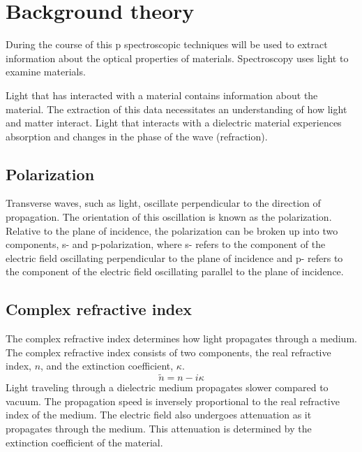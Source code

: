 \chapter{Background theory}
\label{chp:Theory}

During the course of this p spectroscopic techniques will be used to extract information about the optical properties of materials. Spectroscopy uses light to examine materials.

Light that has interacted with a material contains information about the material. The extraction of this data necessitates an understanding of how light and matter interact. Light that interacts with a dielectric material experiences absorption and changes in the phase of the wave (refraction).

\section{Polarization}
\label{sec:Pol}

Transverse waves, such as light, oscillate perpendicular to the direction of propagation. The orientation of this oscillation is known as the polarization. Relative to the plane of incidence, the polarization can be broken up into two components, s- and p-polarization, where s- refers to the component of the electric field oscillating perpendicular to the plane of incidence and p- refers to the component of the electric field oscillating parallel to the plane of incidence.

\section{Complex refractive index}
\label{sec:Attenuation}

The complex refractive index determines how light propagates through a medium. The complex refractive index consists of two components, the real refractive index, $n$, and the extinction coefficient, $\kappa$.
\begin{equation}
\widetilde{n}  = n - i\kappa
\label{eq:compref}
\end{equation}
Light traveling through a dielectric medium propagates slower compared to vacuum. The propagation speed is inversely proportional to the real refractive index of the medium. The electric field also undergoes attenuation as it propagates through the medium. This attenuation is determined by the extinction coefficient of the material.

